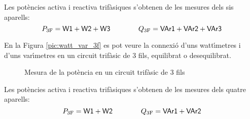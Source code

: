 Les pot\`{e}ncies activa i reactiva trif\`{a}siques s'obtenen de les mesures
dels sis aparells:
\begin{equation}
    P_\mathrm{3F} = \textsf{W1} +  \textsf{W2} + \textsf{W3}
    \qquad\qquad Q_\mathrm{3F} = \textsf{VAr1} +  \textsf{VAr2} + \textsf{VAr3}
\end{equation}

En la Figura \vref{pic:watt_var_3f} es pot veure la connexi\'{o} d'uns
watt\'{\i}metres i d'uns var\'{\i}metres en un circuit trif\`{a}sic de 3 fils,
equilibrat o desequilibrat.
\begin{figure}[htb]
\centering \PSforPDF{
    
} \caption{Mesura de la pot\`{e}ncia en un circuit  trif\`{a}sic de 3 fils}
\label{pic:watt_var_3f}
\end{figure}

Les pot\`{e}ncies activa i reactiva trif\`{a}siques s'obtenen de les mesures
dels quatre aparells:
\begin{equation}
    P_\mathrm{3F} = \textsf{W1} +  \textsf{W2}
    \qquad\qquad Q_\mathrm{3F} = \textsf{VAr1} +  \textsf{VAr2}
\end{equation}
